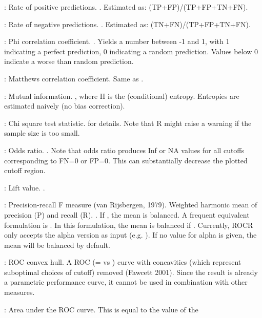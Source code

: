 \begin{Details}
{\item[\code{rpp}:] Rate of positive predictions. . Estimated as: (TP+FP)/(TP+FP+TN+FN).
\item[\code{rnp}:] Rate of negative predictions. . Estimated as: (TN+FN)/(TP+FP+TN+FN).
\item[\code{phi}:] Phi correlation coefficient. . Yields a
number between -1 and 1, with 1 indicating a perfect
prediction, 0 indicating a random prediction. Values below 0
indicate a worse than random prediction.
\item[\code{mat}:] Matthews correlation coefficient. Same as .
\item[\code{mi}:] Mutual information. , where H is the
(conditional) entropy. Entropies are estimated naively (no bias
correction).
\item[\code{chisq}:] Chi square test statistic. 
for details. Note that R might raise a warning if the sample size
is too small.
\item[\code{odds}:] Odds ratio. . Note that odds ratio produces
Inf or NA values for all cutoffs corresponding to FN=0 or
FP=0. This can substantially decrease the plotted cutoff region.
\item[\code{lift}:] Lift
value. .
\item[\code{f}:] Precision-recall F measure (van Rijsbergen, 1979). Weighted
harmonic mean of precision (P) and recall (R). . If
, the mean is balanced. A
frequent equivalent formulation is
. In this formulation, the mean is
balanced if . Currently, ROCR only accepts the
alpha version
as input (e.g. ). If no value for alpha is given, the mean will be
balanced by default.
\item[\code{rch}:] ROC convex hull. A ROC (= vs ) curve with concavities
(which represent suboptimal choices of cutoff) removed (Fawcett 2001). Since the
result is already a parametric performance curve, it cannot be
used in combination with other measures.
\item[\code{auc}:] Area under the ROC curve. This is equal to the value of the
}
\end{Details}
